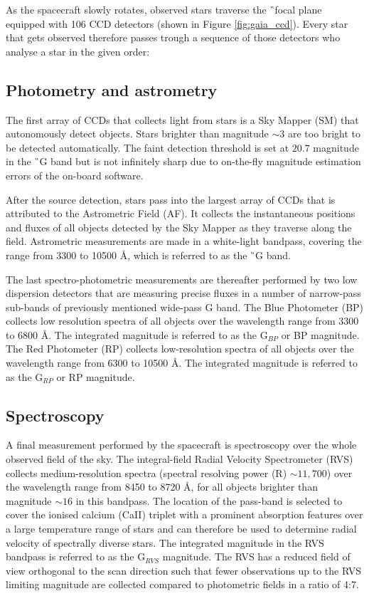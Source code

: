 As the spacecraft slowly rotates, observed stars traverse the \G\ focal plane equipped with 106 CCD detectors (shown in Figure \ref{fig:gaia_ccd}). Every star that gets observed therefore passes trough a sequence of those detectors who analyse a star in the given order:

\subsection{Photometry and astrometry}
The first array of CCDs that collects light from stars is a Sky Mapper (SM) that autonomously detect objects. Stars brighter than magnitude $\sim3$ are too bright to be detected automatically. The faint detection threshold is set at $20.7$ magnitude in the \G\ G band but is not infinitely sharp due
to on-the-fly magnitude estimation errors of the on-board software.

After the source detection, stars pass into the largest array of CCDs that is attributed to the Astrometric Field (AF). It collects the instantaneous positions and fluxes of all objects detected by the Sky Mapper as they traverse along the field. Astrometric measurements are made in a white-light bandpass, covering the range from 3300 to 10500 \AA, which is referred to as the \G\ G band.

The last spectro-photometric measurements are thereafter performed by two low dispersion detectors that are measuring precise fluxes in a number of narrow-pass sub-bands of previously mentioned wide-pass G band. The Blue Photometer (BP) collects low resolution spectra of all objects over the wavelength range from 3300 to 6800 \AA. The integrated magnitude is referred to as the G$_{BP}$ or BP magnitude. The Red Photometer (RP) collects low-resolution spectra of all objects over the wavelength range from 6300 to 10500 \AA. The integrated magnitude is referred to as the G$_{RP}$ or RP magnitude.

\subsection{Spectroscopy}
A final measurement performed by the spacecraft is spectroscopy over the whole observed field of the sky. The integral-field Radial Velocity Spectrometer (RVS) \citep{2018A&A...616A...5C} collects medium-resolution spectra (spectral resolving power (R) $\sim11,700$) over the wavelength range from 8450 to 8720 \AA, for all objects brighter than magnitude $\sim16$ in this bandpass. The location of the pass-band is selected to cover the ionised calcium (CaII) triplet with a prominent absorption features over a large temperature range of stars and can therefore be used to determine radial velocity of spectrally diverse stars. The integrated magnitude in the RVS bandpass is referred to as the G$_{RVS}$ magnitude. The RVS has a reduced field of view orthogonal to the scan direction such that fewer observations up to the RVS limiting magnitude are collected compared to photometric fields in a ratio of 4:7.

